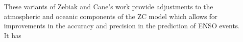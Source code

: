 \documentclass[12pt, onecolumn]{revtex4}    %
\begin{document}
These variants of Zebiak and Cane's work provide adjustments to the atmospheric and oceanic components of the ZC model which allows for improvements in the accuracy and precision in the prediction of ENSO events. \\

It has 



\newpage

\nocite{ruddiman_climate}


\end{document}
